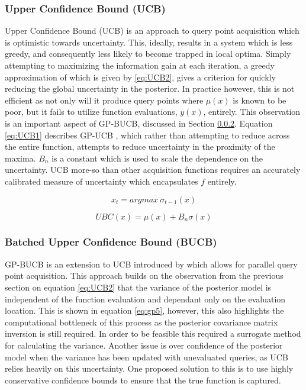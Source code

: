 \documentclass{article}
\begin{document}
		\subsubsection{Upper Confidence Bound (UCB)}
			Upper Confidence Bound (UCB) is an approach to query point acquisition which is optimistic towards uncertainty. This, ideally, results in a system which is less greedy, and consequently less likely to become trapped in local optima. Simply attempting to maximizing the information gain at each iteration, a greedy approximation of which is given by \ref{eq:UCB2}, gives a criterion for quickly reducing the global uncertainty in the posterior. In practice however, this is not efficient as not only will it produce query points where \(\mu(x)\) is known to be poor, but it fails to utilize function evaluations, \(y(x)\), entirely. This observation is an important aspect of GP-BUCB, discussed in Section \ref{BUCB}. Equation \ref{eq:UCB1} describes GP-UCB \cite{GP-UCB}, which rather than attempting to reduce across the entire function, attempts to reduce uncertainty in the proximity of the maxima. \(B_n\) is a constant which is used to scale the dependence on the uncertainty. UCB more-so than other acquisition functions requires an accurately calibrated measure of uncertainty which encapsulates \(f\) entirely.



			\begin{equation}\label{eq:UCB2} x_t = argmax ~\sigma_{t-1}(x) \end{equation}


			\begin{equation}\label{eq:UCB1} UBC(x) = \mu(x) + B_n\sigma(x) \end{equation}




		\subsubsection{Batched Upper Confidence Bound (BUCB)}\label{BUCB}

		GP-BUCB is an extension to UCB introduced by \cite{GP-BUCB} which allows for parallel query point acquisition. This approach builds on the observation from the previous section on equation \ref{eq:UCB2} that the variance of the posterior model is independent of the function evaluation and dependant only on the evaluation location. This is shown in equation \ref{eq:gp5}, however, this also highlights the computational bottleneck of this process as the posterior covariance matrix inversion is still required. In order to be feasible this required a surrogate method for calculating the variance. Another issue is over confidence of the posterior model when the variance has been updated with unevaluated queries, as UCB relies heavily on this uncertainty. One proposed solution to this is to use highly conservative confidence bounds to ensure that the true function is captured.\cite{GP-BUCB}
\end{document}
